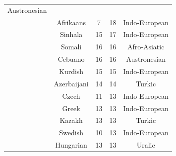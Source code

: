 {\begin{tabular}{|c|c|c|c|c|}
Austronesian \\
	\thetablecount\stepcounter{tablecount} &

Afrikaans &
	

7 &
	

18 &
	

Indo-European \\
	\thetablecount\stepcounter{tablecount} &

Sinhala &
	

15 &
	

17 &
	

Indo-European \\
	\thetablecount\stepcounter{tablecount} &

Somali &
	

16 &
	

16 &
	

Afro-Asiatic \\

	\thetablecount\stepcounter{tablecount} &
Cebuano &
	

16 &
	

16 &
	

Austronesian \\
	\thetablecount\stepcounter{tablecount} &

Kurdish &
	

15 &
	

15 &
	

Indo-European \\

	\thetablecount\stepcounter{tablecount} &
Azerbaijani &
	

14 &
	

14 &
	

Turkic \\

	\thetablecount\stepcounter{tablecount} &
Czech &
	

11 &
	

13 &
	

Indo-European \\
	\thetablecount\stepcounter{tablecount} &

Greek &
	

13 &
	

13 &
	

Indo-European \\
	\thetablecount\stepcounter{tablecount} &

Kazakh &
	

13 &
	

13 &
	

Turkic \\
	\thetablecount\stepcounter{tablecount} &

Swedish &
	

10 &
	

13 &
	

Indo-European \\
	\thetablecount\stepcounter{tablecount}& 

Hungarian &
	

13 &
	

13 &
	

Uralic \\
\hline

\end{tabular}
}


